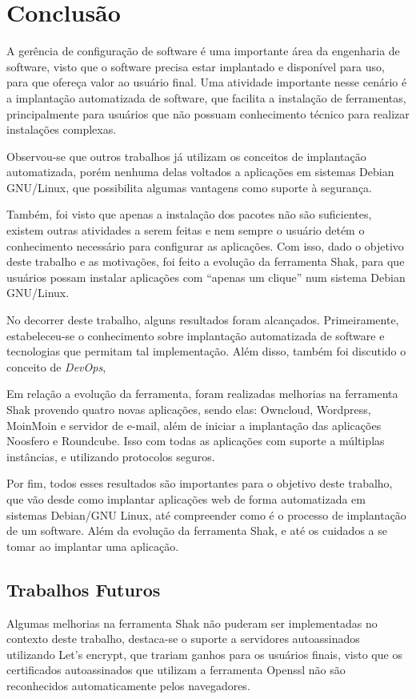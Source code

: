 \chapter{Conclusão}
\label{cap-conclusoes}

A gerência de configuração de software é uma importante área da engenharia de software,
visto que o software precisa estar implantado e disponível para uso, para que ofereça
valor ao usuário final. Uma atividade importante nesse cenário é a implantação
automatizada de software, que facilita a instalação de ferramentas, principalmente
para usuários que não possuam conhecimento técnico para realizar instalações complexas.

Observou-se que outros trabalhos já utilizam os conceitos de implantação automatizada,
porém nenhuma delas voltados a aplicações em sistemas Debian GNU/Linux, que possibilita
algumas vantagens como suporte à segurança.
 
Também, foi visto que apenas a instalação dos pacotes não são suficientes,
existem outras atividades a serem feitas e nem sempre o usuário detém
o conhecimento necessário para configurar as aplicações. Com isso, dado o objetivo
deste trabalho e as motivações, foi feito a evolução da ferramenta Shak, para
que usuários possam instalar aplicações com ``apenas um clique'' num sistema Debian
GNU/Linux.

No decorrer deste trabalho, alguns resultados foram alcançados. Primeiramente,
estabeleceu-se o conhecimento sobre implantação automatizada
de software e tecnologias que permitam tal implementação. Além disso, 
também foi discutido o conceito de \textit{DevOps}, 
 
Em relação a evolução da ferramenta, foram realizadas melhorias na ferramenta Shak
provendo quatro novas aplicações, sendo elas: Owncloud, Wordpress, MoinMoin e
servidor de e-mail, além de iniciar a implantação das aplicações Noosfero e Roundcube. Isso
com todas as aplicações com suporte a múltiplas instâncias, e utilizando protocolos seguros.

Por fim, todos esses resultados são importantes para o objetivo deste trabalho, que vão
desde como implantar aplicações web de forma automatizada em sistemas Debian/GNU Linux, 
até compreender como é o processo de implantação de um software. Além da evolução
da ferramenta Shak, e até os cuidados a se tomar ao implantar uma aplicação.
 
\section{Trabalhos Futuros}
%
Algumas melhorias na ferramenta Shak não puderam ser implementadas no contexto
deste trabalho, destaca-se o suporte a servidores autoassinados utilizando
Let's encrypt, que trariam ganhos para os usuários finais, visto que os certificados
autoassinados que utilizam a ferramenta Openssl não são reconhecidos automaticamente
pelos navegadores. 

